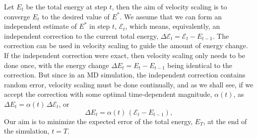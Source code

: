 \documentclass[reprint]{revtex4-1}
\begin{document}
Let $E_t$ be the total energy at step $t$,
then the aim of velocity scaling is to converge $E_t$
to the desired value of $E^*$.
%
We assume that we can form an independent estimate of $E^*$
in step $t$, $\mathcal E_t$,
which means, equivalently, an independent correction
to the current total energy,
$\Delta \mathcal E_t = \mathcal E_t - E_{t-1}$.
%
The correction can be used in velocity scaling
to guide the amount of energy change.
%
If the independent correction were exact,
then velocity scaling only needs to be done once,
with the energy change $\Delta E_t = E_t - E_{t-1}$
being identical to the correction.
%
But since in an MD simulation,
the independent correction contains random error,
velocity scaling must be done continually,
and as we shall see,
if we accept the correction with some
optimal time-dependent magnitude, $\alpha(t)$,
as
$\Delta E_t = \alpha(t) \, \Delta \mathcal E_t$,
or
%
\begin{equation}
  \Delta E_t = \alpha(t) \, \left( \mathcal E_t - E_{t - 1} \right)
  ,
  \label{eq:Eupdate}
\end{equation}
%
Our aim is to minimize
the expected error of the total energy, $E_T$,
at the end of the simulation, $t = T$.
\end{document}
